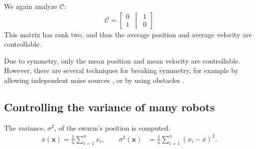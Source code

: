We again analyze $\mathcal{C}$:
\begin{equation}
\mathcal{C}=\left[ \begin{matrix} 
0\\
1
\end{matrix}
\,\middle\vert\,
 \begin{matrix} 
1\\
0
\end{matrix}
 \right]
\end{equation}
This matrix has rank two, and thus the average position and average velocity are controllable.


Due to symmetry, only the mean position and mean velocity are controllable. However, there are several techniques for breaking symmetry, for example by allowing independent noise sources \cite{beckerIJRR2014}, or by using obstacles \cite{Becker2013b}.

\subsection{Controlling the variance of many robots}\label{sec:VarianceControl}

The variance, $\sigma^2$, of the swarm's position is computed:
\begin{align}
 \overline{x}(\mathbf{x}) = \frac{1}{n} \sum_{i=1}^n x_i, \qquad  %
\sigma^2(\mathbf{x}) &= \frac{1}{n} \sum_{i=1}^n (x_i - \overline{x})^2.  %
\end{align}

